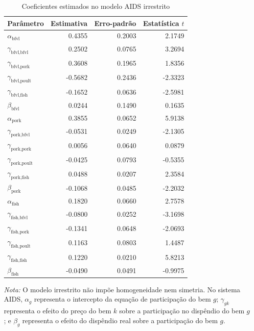 

\begin{table}[H]
\centering
\small
\caption{Coeficientes estimados no modelo AIDS irrestrito}
\label{tab:coeficientes-irrestrito}
\begin{tabular}{@{}lrrr@{}}
\toprule
Parâmetro & Estimativa & Erro-padrão & Estatística $t$ \\
\midrule
$\alpha_{\text{bfvl}}$ & 0.4355 & 0.2003 & 2.1749 \\
$\gamma_{\text{bfvl},\text{bfvl}}$ & 0.2502 & 0.0765 & 3.2694 \\
$\gamma_{\text{bfvl},\text{pork}}$ & 0.3608 & 0.1965 & 1.8356 \\
$\gamma_{\text{bfvl},\text{poult}}$ & -0.5682 & 0.2436 & -2.3323 \\
$\gamma_{\text{bfvl},\text{fish}}$ & -0.1652 & 0.0636 & -2.5981 \\
$\beta_{\text{bfvl}}$ & 0.0244 & 0.1490 & 0.1635 \\
$\alpha_{\text{pork}}$ & 0.3855 & 0.0652 & 5.9138 \\
$\gamma_{\text{pork},\text{bfvl}}$ & -0.0531 & 0.0249 & -2.1305 \\
$\gamma_{\text{pork},\text{pork}}$ & 0.0056 & 0.0640 & 0.0879 \\
$\gamma_{\text{pork},\text{poult}}$ & -0.0425 & 0.0793 & -0.5355 \\
$\gamma_{\text{pork},\text{fish}}$ & 0.0488 & 0.0207 & 2.3584 \\
$\beta_{\text{pork}}$ & -0.1068 & 0.0485 & -2.2032 \\
$\alpha_{\text{fish}}$ & 0.1820 & 0.0660 & 2.7578 \\
$\gamma_{\text{fish},\text{bfvl}}$ & -0.0800 & 0.0252 & -3.1698 \\
$\gamma_{\text{fish},\text{pork}}$ & -0.1341 & 0.0648 & -2.0693 \\
$\gamma_{\text{fish},\text{poult}}$ & 0.1163 & 0.0803 & 1.4487 \\
$\gamma_{\text{fish},\text{fish}}$ & 0.1220 & 0.0210 & 5.8213 \\
$\beta_{\text{fish}}$ & -0.0490 & 0.0491 & -0.9975 \\
\bottomrule
\end{tabular}
\par\vspace{0.35em}
\begin{minipage}{0.92\textwidth}
\footnotesize\textit{Nota:} O modelo irrestrito não impõe homogeneidade nem simetria. No sistema AIDS, $\alpha_g$ representa o intercepto da equação de participação do bem $g$; $\gamma_{gk}$ representa o efeito do preço do bem $k$ sobre a participação no dispêndio do bem $g$; e $\beta_g$ representa o efeito do dispêndio real sobre a participação do bem $g$.
\end{minipage}
\end{table}

